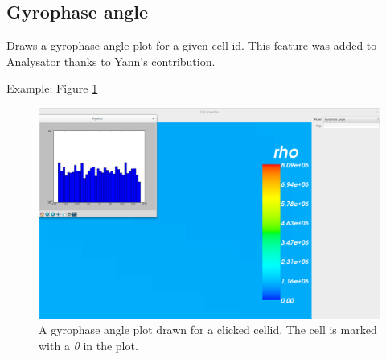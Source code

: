 \documentclass[a4paper,10pt]{article}
\begin{document}
\subsection{Gyrophase angle}

Draws a gyrophase angle plot for a given cell id. This feature was added to Analysator thanks to Yann's 
contribution.

Example: Figure \ref{fig:gyrophase_angle}

\begin{figure}[H]
 \centering
 \includegraphics[width=\textwidth]{images/gyrophase_angle.png}
 \caption{A gyrophase angle plot drawn for a clicked cellid. The cell is marked with a \emph{0} in the plot.}
 \label{fig:gyrophase_angle}
\end{figure}
\end{document}

